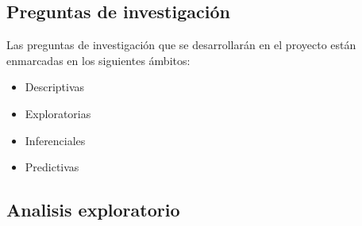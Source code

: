   \subsection{Preguntas de investigación}
  Las preguntas de investigación que se desarrollarán en el proyecto están enmarcadas en los siguientes ámbitos:
  \begin{itemize}
   \item Descriptivas
   \item Exploratorias
   \item Inferenciales
   \item Predictivas
  \end{itemize}
  \subsection{Analisis exploratorio}
